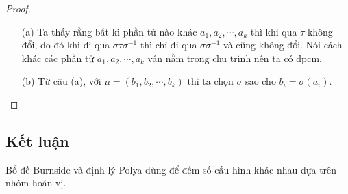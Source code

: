 \begin{proof}
    \begin{enumerate}
        \item [(a)] Ta thấy rằng bất kì phần tử nào khác $a_1, a_2, \cdots, a_k$ thì khi qua $\tau$ không đổi, do đó khi đi qua $\sigma \tau \sigma^{-1}$ thì chỉ đi qua $\sigma \sigma^{-1}$ và cũng không đổi. Nói cách khác các phần tử $a_1, a_2, \cdots, a_k$ vẫn nằm trong chu trình nên ta có đpcm.
        \item [(b)] Từ câu (a), với $\mu = (b_1, b_2, \cdots, b_k)$ thì ta chọn $\sigma$ sao cho $b_i = \sigma(a_i)$.
    \end{enumerate}    
\end{proof}


\subsection*{Kết luận}

Bổ đề Burnside và định lý Polya dùng để đếm số cấu hình khác nhau dựa trên nhóm hoán vị.